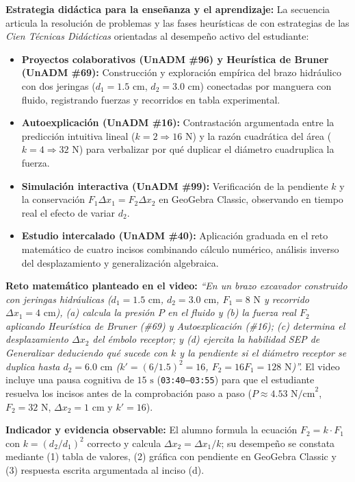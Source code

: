 \documentclass[spanish,letterpaper,oneside]{article}
\begin{document}
\textbf{Estrategia didáctica para la enseñanza y el aprendizaje:} La secuencia articula la resolución de problemas y las fases heurísticas de \citet{polya1945} con estrategias de las \textit{Cien Técnicas Didácticas} \citep{unadm_tecnicas} orientadas al desempeño activo del estudiante:
\begin{itemize}
  \item \textbf{Proyectos colaborativos (UnADM \#96) y Heurística de Bruner (UnADM \#69):} Construcción y exploración empírica del brazo hidráulico con dos jeringas ($d_1 = 1.5\text{ cm}$, $d_2 = 3.0\text{ cm}$) conectadas por manguera con fluido, registrando fuerzas y recorridos en tabla experimental.
  \item \textbf{Autoexplicación (UnADM \#16):} Contrastación argumentada entre la predicción intuitiva lineal ($k = 2 \Rightarrow 16\text{ N}$) y la razón cuadrática del área ($k = 4 \Rightarrow 32\text{ N}$) para verbalizar por qué duplicar el diámetro cuadruplica la fuerza.
  \item \textbf{Simulación interactiva (UnADM \#99):} Verificación de la pendiente $k$ y la conservación $F_1 \Delta x_1 = F_2 \Delta x_2$ en GeoGebra Classic, observando en tiempo real el efecto de variar $d_2$.
  \item \textbf{Estudio intercalado (UnADM \#40):} Aplicación graduada en el reto matemático de cuatro incisos combinando cálculo numérico, análisis inverso del desplazamiento y generalización algebraica.
\end{itemize}

\textbf{Reto matemático planteado en el video:} \textit{``En un brazo excavador construido con jeringas hidráulicas ($d_1 = 1.5\text{ cm}$, $d_2 = 3.0\text{ cm}$, $F_1 = 8\text{ N}$ y recorrido $\Delta x_1 = 4\text{ cm}$), (a) calcula la presión $P$ en el fluido y (b) la fuerza real $F_2$ aplicando Heurística de Bruner (\#69) y Autoexplicación (\#16); (c) determina el desplazamiento $\Delta x_2$ del émbolo receptor; y (d) ejercita la habilidad SEP de Generalizar deduciendo qué sucede con $k$ y la pendiente si el diámetro receptor se duplica hasta $d_2 = 6.0\text{ cm}$ ($k' = (6/1.5)^2 = 16$, $F_2 = 16 F_1 = 128\text{ N}$)''.} El video incluye una pausa cognitiva de $15\text{ s}$ (\texttt{03:40--03:55}) para que el estudiante resuelva los incisos antes de la comprobación paso a paso ($P \approx 4.53\text{ N/cm}^2$, $F_2 = 32\text{ N}$, $\Delta x_2 = 1\text{ cm}$ y $k'=16$).

\textbf{Indicador y evidencia observable:} El alumno formula la ecuación $F_2 = k\cdot F_1$ con $k = (d_2/d_1)^2$ correcto y calcula $\Delta x_2 = \Delta x_1 / k$; su desempeño se constata mediante (1) tabla de valores, (2) gráfica con pendiente en GeoGebra Classic y (3) respuesta escrita argumentada al inciso (d).
\end{document}
